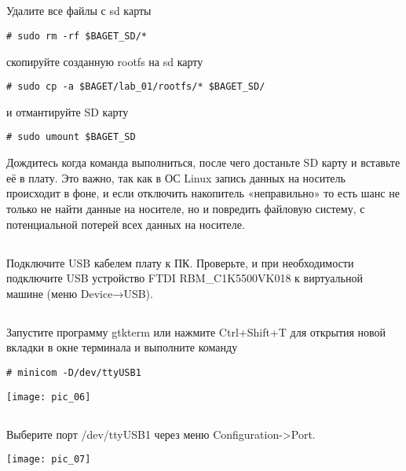 \subsection{}Удалите все файлы с sd карты
\begin{lstlisting}[style=bash]
# sudo rm -rf $BAGET_SD/*
\end{lstlisting}
скопируйте созданную rootfs на sd карту
\begin{lstlisting}[style=bash]
# sudo cp -a $BAGET/lab_01/rootfs/* $BAGET_SD/
\end{lstlisting}
и отмантируйте SD карту 
\begin{lstlisting}[style=bash]
# sudo umount $BAGET_SD
\end{lstlisting}
Дождитесь когда команда выполниться, после чего достаньте SD карту и вставьте её в плату.
Это важно, так как в ОС Linux запись данных на носитель происходит в фоне, и если отключить накопитель «неправильно» то есть шанс не только не найти данные на носителе, но и повредить файловую систему, с потенциальной потерей всех данных на носителе.

\subsection{}Подключите USB кабелем плату к ПК. Проверьте, и при необходимости подключите USB устройство FTDI RBM\_C1K5500VK018 к виртуальной машине (меню Device→USB).

\subsection{} Запустите программу gtkterm или нажмите Ctrl+Shift+T для открытия новой вкладки в окне терминала и выполните команду 

\begin{lstlisting}[style=bash]
	# minicom -D/dev/ttyUSB1
\end{lstlisting}
\begin{center}
	\texttt{[image: pic\_06]}
\end{center}

\subsection{} Выберите порт  /dev/ttyUSB1 через меню Configuration->Port.
\begin{center}
	\texttt{[image: pic\_07]}
\end{center}

